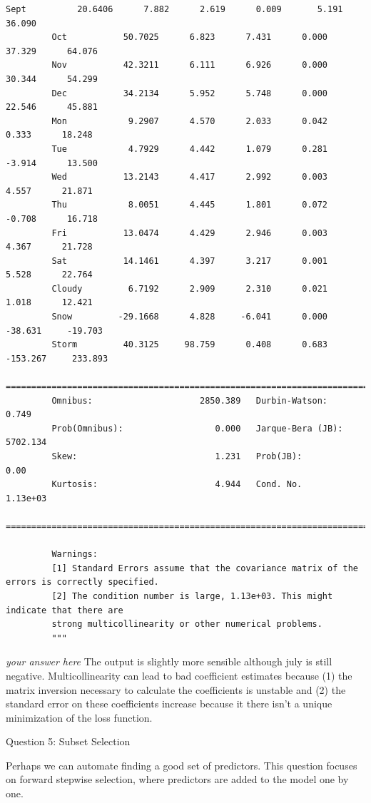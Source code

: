 \documentclass[11pt]{article}
\begin{document}
\begin{Verbatim}[commandchars=\\\{\}]
         Sept          20.6406      7.882      2.619      0.009       5.191      36.090
         Oct           50.7025      6.823      7.431      0.000      37.329      64.076
         Nov           42.3211      6.111      6.926      0.000      30.344      54.299
         Dec           34.2134      5.952      5.748      0.000      22.546      45.881
         Mon            9.2907      4.570      2.033      0.042       0.333      18.248
         Tue            4.7929      4.442      1.079      0.281      -3.914      13.500
         Wed           13.2143      4.417      2.992      0.003       4.557      21.871
         Thu            8.0051      4.445      1.801      0.072      -0.708      16.718
         Fri           13.0474      4.429      2.946      0.003       4.367      21.728
         Sat           14.1461      4.397      3.217      0.001       5.528      22.764
         Cloudy         6.7192      2.909      2.310      0.021       1.018      12.421
         Snow         -29.1668      4.828     -6.041      0.000     -38.631     -19.703
         Storm         40.3125     98.759      0.408      0.683    -153.267     233.893
         ==============================================================================
         Omnibus:                     2850.389   Durbin-Watson:                   0.749
         Prob(Omnibus):                  0.000   Jarque-Bera (JB):             5702.134
         Skew:                           1.231   Prob(JB):                         0.00
         Kurtosis:                       4.944   Cond. No.                     1.13e+03
         ==============================================================================
         
         Warnings:
         [1] Standard Errors assume that the covariance matrix of the errors is correctly specified.
         [2] The condition number is large, 1.13e+03. This might indicate that there are
         strong multicollinearity or other numerical problems.
         """
\end{Verbatim}
            
    \emph{your answer here} The output is slightly more sensible although
july is still negative. Multicollinearity can lead to bad coefficient
estimates because (1) the matrix inversion necessary to calculate the
coefficients is unstable and (2) the standard error on these
coefficients increase because it there isn't a unique minimization of
the loss function.

     Question 5: Subset Selection

Perhaps we can automate finding a good set of predictors. This question
focuses on forward stepwise selection, where predictors are added to the
model one by one.
\end{document}
